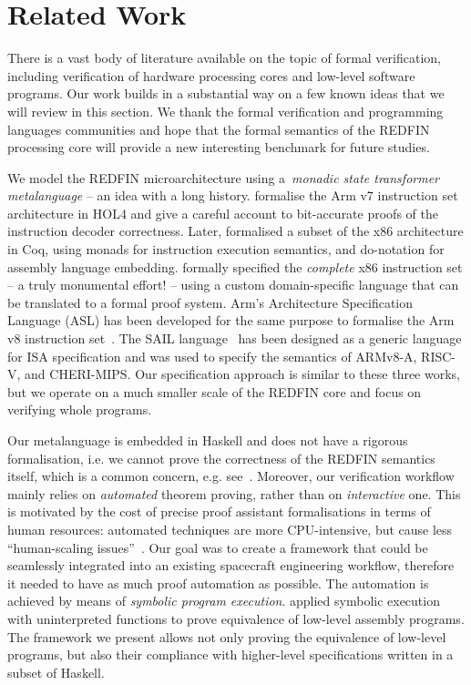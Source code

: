 \section{Related Work\label{sec-related}}
There is a vast body of literature available on the topic of formal verification,
including verification of hardware processing cores and low-level software programs.
Our work builds in a substantial way on a few known ideas that we will review in
this section. We thank the formal verification and programming languages
communities and hope that the formal semantics of the REDFIN processing core
will provide a new interesting benchmark for future studies.

We model the REDFIN microarchitecture using a~\emph{monadic state transformer
metalanguage} -- an idea with a long history.
\citet{fox2010trustworthy} formalise the Arm v7 instruction
set architecture in HOL4 and give a careful account to bit-accurate proofs of
the instruction decoder correctness. Later, \citet{kennedy2013coq}
formalised a subset of the x86 architecture in Coq, using monads for instruction
execution semantics, and \textsf{do}-notation for assembly language embedding.
\citet{degenbaev2012formal} formally specified the \emph{complete} x86
instruction set -- a truly monumental effort! -- using a custom domain-specific
language that can be translated to a formal proof system. Arm's Architecture
Specification Language (ASL) has been developed for the same purpose to formalise the
Arm v8 instruction set~\cite{reid2016cav}. The SAIL language~\cite{SAIL-lang} has
been designed as a generic language for ISA specification and was used to
specify the semantics of ARMv8-A, \mbox{RISC-V}, and \mbox{CHERI-MIPS}.
Our specification approach is similar to these three works, but we operate on a
much smaller scale of the REDFIN core and focus on verifying whole programs.

Our metalanguage is embedded in Haskell and does not have a rigorous
formalisation, i.e. we cannot prove the correctness of the REDFIN semantics
itself, which is a common concern, e.g. see~\citet{reid2017oopsla}. Moreover, our
verification workflow mainly relies on \emph{automated} theorem proving, rather
than on \emph{interactive} one. This is motivated by the cost of precise proof
assistant formalisations in terms of human resources: automated techniques are
more CPU-intensive, but cause less ``human-scaling issues''~\cite{reid2016cav}.
Our goal was to create a framework that could be seamlessly
integrated into an existing spacecraft engineering workflow, therefore it needed
to have as much proof automation as possible. The automation is achieved by means
of \emph{symbolic program execution}. \citet{Currie2006} applied
symbolic execution with uninterpreted functions to prove equivalence of low-level
assembly programs. The framework we present allows not only proving the
equivalence of low-level programs, but also their compliance with higher-level
specifications written in a subset of Haskell.

